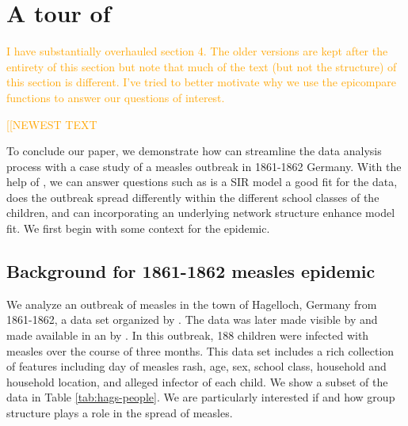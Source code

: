 \documentclass[
  shortnames]{jss}
\begin{document}
\section[Tour]{A tour of }\label{sec:tour}

\textcolor{orange}{I have substantially overhauled section 4.  The older versions are kept after the entirety of this section but note that much of the text (but not the structure) of this section is different.  I've tried to better motivate why we use the epicompare functions to answer our questions of interest.}

\textcolor{orange}{[[NEWEST TEXT}

To conclude our paper, we demonstrate how  can
streamline the data analysis process with a case study of a measles
outbreak in 1861-1862 Germany. With the help of , we can
answer questions such as is a SIR model a good fit for the data, does
the outbreak spread differently within the different school classes of
the children, and can incorporating an underlying network structure
enhance model fit. We first begin with some context for the epidemic.

\hypertarget{background-for-1861-1862-measles-epidemic}{%
\subsection{Background for 1861-1862 measles
epidemic}\label{background-for-1861-1862-measles-epidemic}}

We analyze an outbreak of measles in the town of Hagelloch, Germany from
1861-1862, a data set organized by \cite{pfeilsticker1863}. The data was
later made visible by \cite{oesterle1992} and made available in an
 by \cite{surveillance2017}. In this outbreak, 188 children
were infected with measles over the course of three months. This data
set includes a rich collection of features including day of measles
rash, age, sex, school class, household and household location, and
alleged infector of each child. We show a subset of the data in Table
\ref{tab:hags-people}. We are particularly interested if and how group
structure plays a role in the spread of measles.
\end{document}
